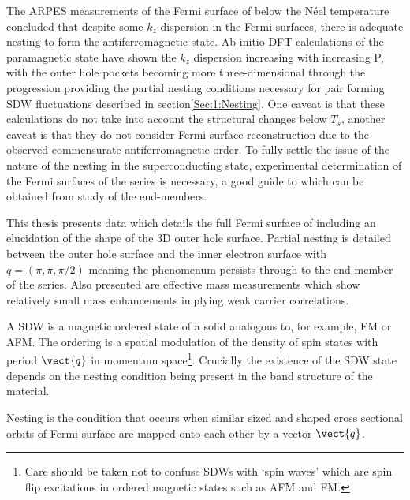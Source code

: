 The ARPES measurements of the Fermi surface of \BaFeAs below the N\'eel temperature concluded that despite some $k_z$ dispersion in the Fermi surfaces, there is adequate nesting to form the antiferromagnetic state. Ab-initio DFT calculations\cite{Shishido2010} of the paramagnetic state have shown the $k_z$ dispersion increasing with increasing P, with the outer hole pockets becoming more three-dimensional through the progression providing the partial nesting conditions necessary for pair forming SDW fluctuations described in section\ref{Sec:1:Nesting}. One caveat is that these calculations do not take into account the structural changes below $T_s$, another caveat is that they do not consider Fermi surface reconstruction due to the observed commensurate antiferromagnetic order. To fully settle the issue of the nature of the nesting in the superconducting state, experimental determination of the Fermi surfaces of the series is necessary, a good guide to which can be obtained from study of the end-members.


This thesis presents data which details the full Fermi surface of \BaFeP including an elucidation of the shape of the 3D outer hole surface. Partial nesting is detailed between the outer hole surface and the inner electron surface with $q=(\pi, \pi, \pi/2)$ meaning the phenomenum persists through to the end member of the series. Also presented are effective mass measurements which show relatively small mass enhancements implying weak carrier correlations.




A \acf{SDW} is a magnetic ordered state of a solid analogous to, for example, \acf{FM} or \acf{AFM}. The ordering is a spatial modulation of the density of spin states with period $\vect{q}$ in momentum space\footnote{Care should be taken not to confuse \acp{SDW} with `spin waves' which are spin flip excitations in ordered magnetic states such as \ac{AFM} and \ac{FM}.}. Crucially the existence of the \ac{SDW} state depends on the nesting condition being present in the band structure of the material.

Nesting is the condition that occurs when similar sized and shaped cross sectional orbits of Fermi surface are mapped onto each other by a vector $\vect{q}$.


